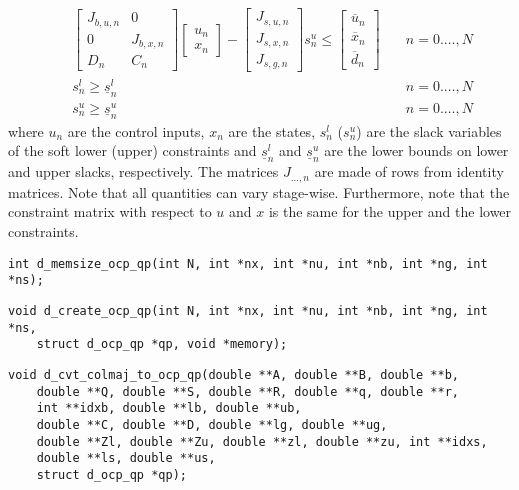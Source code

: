 \documentclass[a4paper]{report}
\begin{document}
\begin{align*}
& \quad \begin{bmatrix} J_{b,u,n} & 0 \\ 0 & J_{b,x,n} \\ D_n & C_n \end{bmatrix} \begin{bmatrix} u_n \\ x_n \end{bmatrix} - \begin{bmatrix} J_{s,u,n} \\ J_{s,x,n} \\ J_{s,g,n} \end{bmatrix} s^u_n \leq \begin{bmatrix} \overline u_n \\ \overline x_n \\ \overline d_n \end{bmatrix} & \quad n=0.\dots,N \\
& \quad s^l_n\geq \underline{s}^l_n & \quad n=0.\dots,N \\
& \quad s^u_n\geq \underline{s}^u_n & \quad n=0.\dots,N
\end{align*}
where $u_n$ are the control inputs, $x_n$ are the states, $s^l_n$ ($s^u_n$) are the slack variables of the soft lower (upper) constraints
and $\underline{s}^l_n$ and $\underline{s}^u_n$ are the lower bounds on lower and upper slacks, respectively.
The matrices $J_{\dots,n}$ are made of rows from identity matrices.
Note that all quantities can vary stage-wise.
Furthermore, note that the constraint matrix with respect to $u$ and $x$ is the same for the upper and the lower constraints.

\begin{verbatim}
int d_memsize_ocp_qp(int N, int *nx, int *nu, int *nb, int *ng, int *ns);
\end{verbatim}

\begin{verbatim}
void d_create_ocp_qp(int N, int *nx, int *nu, int *nb, int *ng, int *ns, 
    struct d_ocp_qp *qp, void *memory);
\end{verbatim}

\begin{verbatim}
void d_cvt_colmaj_to_ocp_qp(double **A, double **B, double **b, 
    double **Q, double **S, double **R, double **q, double **r, 
    int **idxb, double **lb, double **ub, 
    double **C, double **D, double **lg, double **ug, 
    double **Zl, double **Zu, double **zl, double **zu, int **idxs, 
    double **ls, double **us,
    struct d_ocp_qp *qp);
\end{verbatim}






\end{document}
